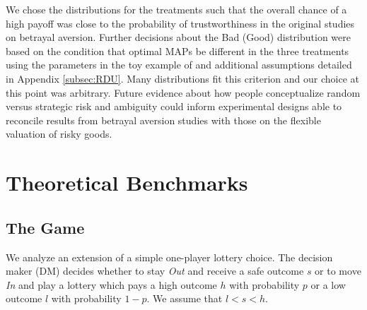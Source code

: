 We chose the distributions for the treatments such that the overall chance of a high payoff was close to the probability of trustworthiness in the original studies on betrayal aversion.
Further decisions about the Bad (Good) distribution were based on the condition that optimal MAPs be different in the three treatments using the parameters in the toy example of \cite{Li2020a} and additional assumptions detailed in Appendix \ref{subsec:RDU}.
Many distributions fit this criterion and our choice at this point was arbitrary.
Future evidence about how people conceptualize random versus strategic risk and ambiguity could inform experimental designs able to reconcile results from betrayal aversion studies with those on the flexible valuation of risky goods.


%
%
%



\clearpage
\pagebreak



\clearpage
\pagebreak

\appendix
\section{Theoretical Benchmarks}
\label{section:appendixa}
\setcounter{figure}{0}
\setcounter{table}{0}
\renewcommand{\thefigure}{A.\arabic{figure}}
\renewcommand{\thetable}{A.\arabic{table}}
\subsection{The Game}

We analyze an extension of a simple one-player lottery choice.
The decision maker (DM) decides whether to stay \emph{Out} and receive a safe outcome $s$ or to move \emph{In} and play a lottery which pays a high outcome $h$ with probability $p$ or a low outcome $l$ with probability $1-p$.
We assume that $l < s < h$. 

